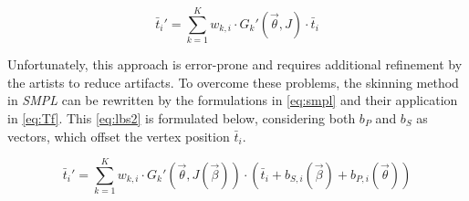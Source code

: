 \begin{equation}
\label{eq:lbs}
\bar{t}_{i}' = \sum_{k=1}^{K} w_{k,i} \cdot G_{k}'(\vec{\theta},J) \cdot \bar{t}_{i}
\end{equation}

Unfortunately, this approach is error-prone and requires additional refinement by the artists to reduce artifacts. To overcome these problems, the skinning method in \emph{SMPL} can be rewritten by the formulations in \autoref{eq:smpl} and their application in \autoref{eq:Tf}. This \autoref{eq:lbs2} is formulated below, considering both $b_{P}$ and $b_{S}$ as vectors, which offset the vertex position $\bar{t}_{i}$.

\begin{equation}
\label{eq:lbs2}
\bar{t}_{i}' = \sum_{k=1}^{K} w_{k,i} \cdot G_{k}'(\vec{\theta},J(\vec{\beta})) \cdot (\bar{t}_{i} + b_{S,i}(\vec{\beta}) + b_{P,i}(\vec{\theta}))
\end{equation}
